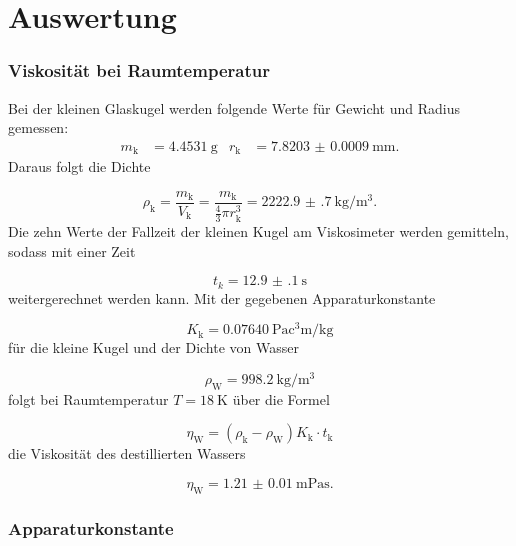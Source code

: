 \section{Auswertung}
\label{sec:Auswertung}

\subsubsection{Viskosität bei Raumtemperatur}

Bei der kleinen Glaskugel werden folgende Werte für Gewicht und Radius
gemessen:
\begin{align}
  m_\text{k} & = \SI{4.4531}{\gram} & r_\text{k} & =
  \SI{7.8203(9)}{\milli\meter}.
\end{align}
Daraus folgt die Dichte

\begin{equation}
  \rho_\text{k} = \frac{m_\text{k}}{V_\text{k}} = \frac{m_\text{k}}
  {\frac{4}{3}\pi r_\text{k}^3} = \SI{2222.9(7)}{\kilo\gram\per\cubic\meter}.
\end{equation}
Die zehn Werte der Fallzeit der kleinen Kugel am Viskosimeter werden gemitteln,
sodass mit einer Zeit

\begin{equation}
  t_{k} = \SI{12.9(1)}{\second}
\end{equation}
weitergerechnet werden kann.
Mit der gegebenen Apparaturkonstante

\begin{equation}
  K_\text{k} = \SI{0.07640}{\pascal\cubic\centi\meter\per\kilo\gram}
\end{equation}
für die kleine Kugel und der Dichte von Wasser \cite{Wasserdichte}

\begin{equation}
  \rho_\text{W} = \SI{998.2}{\kilo\gram\per\cubic\meter}
\end{equation}
folgt bei Raumtemperatur $T=\SI{18}{\kelvin}$ über die Formel

\begin{equation}
  \eta_\text{W} = (\rho_\text{k}-\rho_\text{W})K_\text{k} \cdot t_\text{k}
  \label{eqn:Viskositaet}
\end{equation}
die Viskosität des destillierten Wassers

\begin{equation}
  \eta_\text{W} = \SI{1.21(1)}{\milli\pascal\second}.
\end{equation}

\subsubsection{Apparaturkonstante}

